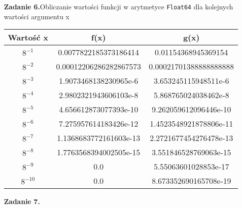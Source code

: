 \documentclass[15pt, a4paper]{article}
\begin{document}
\vspace{0.5cm}

\noindent\hrulefill


\vspace{0.5cm}

\noindent\textbf{Zadanie 6.}Obliczanie wartości funkcji w arytmetyce \verb|Float64| dla kolejnych wartości argumentu x


\begin{table}[ht]
    \begin{tabular}{|c|c|c|}
        \hline 
        Wartość x & f(x) & g(x) \\ \hline
        $8^{\mathrm{-1}}$ & 0.0077822185373186414 & 0.01154368945369154 \\ \hline
        $8^{\mathrm{-2}}$ & 0.00012206286282867573 & 0.00021701388888888888 \\ \hline
        $8^{\mathrm{-3}}$ & 1.9073468138230965e-6 & 3.653245115948511e-6 \\ \hline
        $8^{\mathrm{-4}}$ & 2.9802321943606103e-8 & 5.868765024038462e-8 \\ \hline
        $8^{\mathrm{-5}}$ & 4.656612873077393e-10 & 9.262059612096446e-10 \\ \hline
        $8^{\mathrm{-6}}$ & 7.275957614183426e-12 & 1.4523548921878806e-11 \\ \hline
        $8^{\mathrm{-7}}$ & 1.1368683772161603e-13 & 2.2721677454276478e-13 \\ \hline
        $8^{\mathrm{-8}}$ & 1.7763568394002505e-15 & 3.551846528769063e-15 \\ \hline
        $8^{\mathrm{-9}}$ & 0.0 & 5.55063601028853e-17 \\ \hline
        $8^{\mathrm{-10}}$ & 0.0 & 8.673352690165708e-19 \\ \hline
    \end{tabular}
    \label{tab:macheps}
\end{table}

\vspace{0.5cm}

\noindent\hrulefill


\vspace{0.5cm}

\noindent\textbf{Zadanie 7.} 
\end{document}
